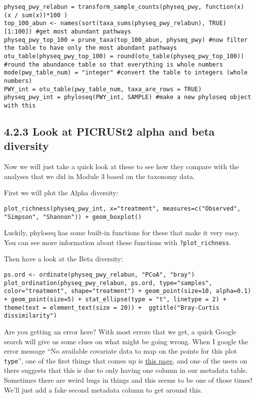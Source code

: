 \documentclass[
]{book}
\begin{document}
\begin{verbatim}
physeq_pwy_relabun = transform_sample_counts(physeq_pwy, function(x) (x / sum(x))*100 )
top_100_abun <- names(sort(taxa_sums(physeq_pwy_relabun), TRUE)[1:100]) #get most abundant pathways
physeq_pwy_top_100 = prune_taxa(top_100_abun, physeq_pwy) #now filter the table to have only the most abundant pathways
otu_table(physeq_pwy_top_100) = round(otu_table(physeq_pwy_top_100)) #round the abundance table so that everything is whole numbers
mode(pwy_table_num) = "integer" #convert the table to integers (whole numbers)
PWY_int = otu_table(pwy_table_num, taxa_are_rows = TRUE)
physeq_pwy_int = phyloseq(PWY_int, SAMPLE) #make a new phyloseq object with this
\end{verbatim}

\subsection{4.2.3 Look at PICRUSt2 alpha and beta diversity}\label{look-at-picrust2-alpha-and-beta-diversity}

Now we will just take a quick look at these to see how they compare with the analyses that we did in Module 3 based on the taxonomy data.

First we will plot the Alpha diversity:

\begin{verbatim}
plot_richness(physeq_pwy_int, x="treatment", measures=c("Observed", "Simpson", "Shannon")) + geom_boxplot()
\end{verbatim}

Luckily, phyloseq has some built-in functions for these that make it very easy. You can see more information about these functions with \texttt{?plot\_richness}.

Then have a look at the Beta diversity:

\begin{verbatim}
ps.ord <- ordinate(physeq_pwy_relabun, "PCoA", "bray")
plot_ordination(physeq_pwy_relabun, ps.ord, type="samples", color="treatment", shape="treatment") + geom_point(size=10, alpha=0.1) + geom_point(size=5) + stat_ellipse(type = "t", linetype = 2) + theme(text = element_text(size = 20)) +  ggtitle("Bray-Curtis dissimilarity")
\end{verbatim}

Are you getting an error here? With most errors that we get, a quick Google search will give us some clues on what might be going wrong. When I google the error message ``No available covariate data to map on the points for this plot \texttt{type}'', one of the first things that comes up is \href{https://github.com/joey711/phyloseq/issues/541}{this page}, and one of the users on there suggests that this is due to only having one column in our metadata table. Sometimes there are weird bugs in things and this seems to be one of those times! We'll just add a fake second metadata column to get around this.
\end{document}
